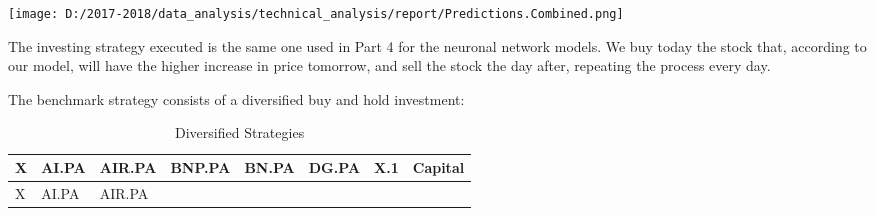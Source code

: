\documentclass[
  11pt,
]{article}
\let\origfigure\figure
\let\endorigfigure\endfigure
\renewenvironment{figure}[1][2] {
    \expandafter\origfigure\expandafter[H]
} {
    \endorigfigure
}
\begin{document}
\begin{figure}
\centering
\texttt{[image: D:/2017-2018/data\_analysis/technical\_analysis/report/Predictions.Combined.png]}
\caption{Predictions of All the 5 Stocks}
\end{figure}

The investing strategy executed is the same one used in Part 4 for the
neuronal network models. We buy today the stock that, according to our
model, will have the higher increase in price tomorrow, and sell the
stock the day after, repeating the process every day.

The benchmark strategy consists of a diversified buy and hold
investment:

\begin{longtable}[]{@{}llllllll@{}}
\caption{Diversified Strategies}\tabularnewline
\toprule
\begin{minipage}[b]{0.10\columnwidth}\raggedright
X\strut
\end{minipage} & \begin{minipage}[b]{0.06\columnwidth}\raggedright
AI.PA\strut
\end{minipage} & \begin{minipage}[b]{0.07\columnwidth}\raggedright
AIR.PA\strut
\end{minipage} & \begin{minipage}[b]{0.07\columnwidth}\raggedright
BNP.PA\strut
\end{minipage} & \begin{minipage}[b]{0.06\columnwidth}\raggedright
BN.PA\strut
\end{minipage} & \begin{minipage}[b]{0.06\columnwidth}\raggedright
DG.PA\strut
\end{minipage} & \begin{minipage}[b]{0.19\columnwidth}\raggedright
X.1\strut
\end{minipage} & \begin{minipage}[b]{0.16\columnwidth}\raggedright
Capital\strut
\end{minipage}\tabularnewline
\midrule
\endfirsthead
\toprule
\begin{minipage}[b]{0.10\columnwidth}\raggedright
X\strut
\end{minipage} & \begin{minipage}[b]{0.06\columnwidth}\raggedright
AI.PA\strut
\end{minipage} & \begin{minipage}[b]{0.07\columnwidth}\raggedright
AIR.PA\strut
\end{minipage} & \begin{minipage}[b]{0.07\columnwidth}\raggedright

\end{minipage}
\end{longtable}
\end{document}
